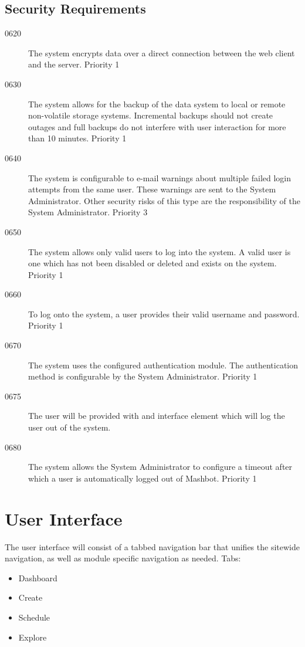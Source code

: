 \documentclass{article}
\begin{document}
\subsection{Security Requirements} %
\begin{description}
\item[0620] The system encrypts data over a direct connection between the
  web client and the server.  Priority 1
\item[0630] The system allows for the backup of the data system to local or
  remote non-volatile storage systems.  Incremental backups should not
  create outages and full backups do not interfere with user
  interaction for more than 10 minutes. Priority 1
\item[0640] The system is configurable to e-mail warnings about multiple
  failed login attempts from the same user. These warnings are sent to
  the System Administrator. Other security risks of this type are the
  responsibility of the System Administrator. Priority 3
\item[0650] The system allows only valid users to log into the system. A
  valid user is one which has not been disabled or deleted and exists
  on the system. Priority 1
\item[0660] To log onto the system, a user provides their valid username and
  password. Priority 1
\item[0670] The system uses the configured authentication module. The
  authentication method is configurable by the System
  Administrator. Priority 1
\item[0675] The user will be provided with and interface element which
  will log the user out of the system.
\item[0680] The system allows the System Administrator to configure a
  timeout after which a user is automatically logged out of
  Mashbot. Priority 1
\end{description}

\section{User Interface} %
The user interface will consist of a tabbed navigation bar that
unifies the sitewide navigation, as well as module specific navigation
as needed. Tabs:
\begin{itemize}
\item Dashboard
\item Create
\item Schedule
\item Explore
\end{itemize}
\end{document}
